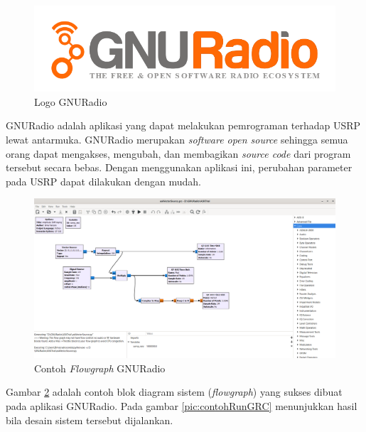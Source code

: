 \begin{figure}
	\begin{center}
		\includegraphics[scale=0.35]{pics/bab2/GNU.png} 
		\caption[Logo GNURadio]{Logo GNURadio}
		\label{pic:logoGnuRadio}
	\end{center}
\end{figure}
GNURadio adalah aplikasi yang dapat melakukan pemrograman terhadap USRP lewat antarmuka. GNURadio merupakan \textit{software open source} sehingga semua orang dapat mengakses, mengubah, dan membagikan \textit{source code} dari program tersebut secara bebas. Dengan menggunakan aplikasi ini, perubahan parameter pada USRP dapat dilakukan dengan mudah.

\begin{figure}
	\begin{center}
		\includegraphics[scale=0.3]{pics/bab2/blokDiagramGRC.png} 
		\caption[Contoh \textit{Flowgraph} GNURadio]{Contoh \textit{Flowgraph} GNURadio}
		\label{pic:contohFlowGraphGRC}
	\end{center}
\end{figure}

Gambar \ref{pic:contohFlowGraphGRC} adalah contoh blok diagram sistem (\textit{flowgraph}) yang sukses dibuat pada aplikasi GNURadio. Pada gambar \ref{pic:contohRunGRC} menunjukkan hasil bila desain sistem tersebut dijalankan.

